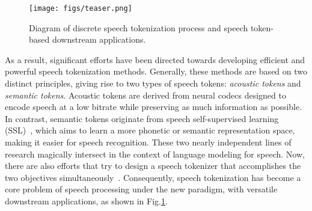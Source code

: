 \begin{figure}
    \centering
    \texttt{[image: figs/teaser.png]}
    \caption{Diagram of discrete speech tokenization process and speech token-based downstream applications.}
    \label{fig:diagram}
    \vspace{-0.2in}
\end{figure}


As a result, significant efforts have been directed towards developing efficient and powerful speech tokenization methods. Generally, these methods are based on two distinct principles, giving rise to two types of speech tokens: \textit{acoustic tokens} and \textit{semantic tokens}.
Acoustic tokens are derived from neural codecs designed to encode speech at a low bitrate while preserving as much information as possible. In contrast, semantic tokens originate from speech self-supervised learning (SSL)~\cite{mohamed2022self}, which aims to learn a more phonetic or semantic representation space, making it easier for speech recognition.
These two nearly independent lines of research magically intersect in the context of language modeling for speech.
Now, there are also efforts that try to design a speech tokenizer that accomplishes the two objectives simultaneously~\cite{zhang2024speechtokenizer,kyutai2024moshi}.
Consequently, speech tokenization has become a core problem of speech processing under the new paradigm, with versatile downstream applications, as shown in Fig.\ref{fig:diagram}.

